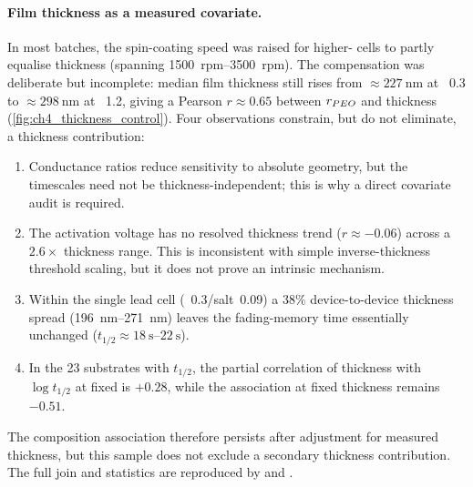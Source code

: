 \paragraph{Film thickness as a measured covariate.} In most batches, the
spin-coating speed was raised for higher-\PEO{} cells to partly equalise
thickness (spanning \SIrange{1500}{3500}{rpm}). The compensation was deliberate
but incomplete: median film thickness still rises from
\(\approx\SI{227}{\nano\meter}\) at \PEO{}~\num{0.3} to
\(\approx\SI{298}{\nano\meter}\) at \PEO{}~\num{1.2}, giving a Pearson
\(r\approx0.65\) between \(r_{PEO{}}\) and thickness
(\cref{fig:ch4_thickness_control}).
Four observations constrain, but do not eliminate, a thickness contribution:
\begin{enumerate}
  \item Conductance ratios reduce sensitivity to absolute geometry, but the timescales need not be thickness-independent; this is why a direct covariate audit is required.
  \item The activation voltage has no resolved thickness trend (\(r\approx-0.06\)) across a \(2.6\times\) thickness range. This is inconsistent with simple inverse-thickness threshold scaling, but it does not prove an intrinsic mechanism.
  \item Within the single lead cell (\PEO{}~\num{0.3}/salt~\num{0.09}) a \(38\%\) device-to-device thickness spread (\SIrange{196}{271}{\nano\meter}) leaves the fading-memory time essentially unchanged (\(t_{1/2}\approx\SIrange{18}{22}{\second}\)).
  \item In the \num{23} substrates with \(t_{1/2}\), the partial correlation of thickness with \(\log t_{1/2}\) at fixed \PEO{} is \(+0.28\), while the \PEO{} association at fixed thickness remains \(-0.51\).
\end{enumerate}
The composition association therefore persists after adjustment for measured
thickness, but this sample does not exclude a secondary thickness contribution.
The full join and statistics are reproduced by
 and
.

